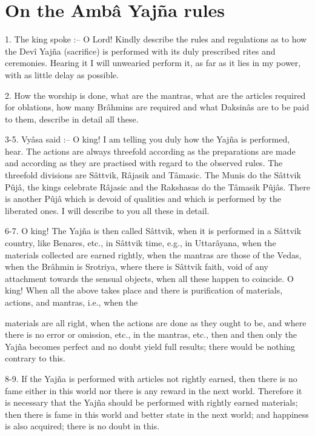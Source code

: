 ﻿\chapter{On the Amb\^a Yaj\~na rules}

1. The king spoke :-- O Lord! Kindly describe the rules and regulations as to how the Dev\^i Yaj\~na (sacrifice) is performed with its duly prescribed rites and ceremonies. Hearing it I will unwearied perform it, as far as it lies in my power, with as little delay as possible.

2. How the worship is done, what are the mantras, what are the articles required for oblations, how many Br\^ahmins are required and what Daksin\^as are to be paid to them, describe in detail all these.

3-5. Vy\^asa said :-- O king! I am telling you duly how the Yaj\~na is performed, hear. The actions are always threefold according as the preparations are made and according as they are practised with regard to the observed rules. The threefold divisions are S\^attvik, R\^ajasik and T\^amasic. The Munis do the S\^attvik Pûj\^a, the kings celebrate R\^ajasic and the Rakshasas do the T\^amasik Pûj\^as. There is another Pûj\^a which is devoid of qualities and which is performed by the liberated ones. I will describe to you all these in detail.

6-7. O king! The Yaj\~na is then called S\^attvik, when it is performed in a S\^attvik country, like Benares, etc., in S\^attvik time, e.g., in Uttar\^ayana, when the materials collected are earned rightly, when the mantras are those of the Vedas, when the Br\^ahmin is Srotriya, where there is S\^attvik faith, void of any attachment towards the sensual objects, when all these happen to coincide. O king! When all the above takes place and there is purification of materials, actions, and mantras, i.e., when the

materials are all right, when the actions are done as they ought to be, and where there is no error or omission, etc., in the mantras, etc., then and then only the Yaj\~na becomes perfect and no doubt yield full results; there would be nothing contrary to this.

8-9. If the Yaj\~na is performed with articles not rightly earned, then there is no fame either in this world nor there is any reward in the next world. Therefore it is necessary that the Yaj\~na should be performed with rightly earned materials; then there is fame in this world and better state in the next world; and happiness is also acquired; there is no doubt in this.

